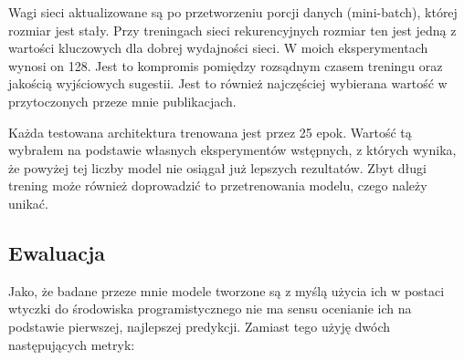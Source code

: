 \begin{description}
Wagi sieci aktualizowane są po przetworzeniu porcji danych (mini-batch), której rozmiar jest stały. Przy treningach sieci rekurencyjnych rozmiar
ten jest jedną z wartości kluczowych dla dobrej wydajności sieci. W moich eksperymentach wynosi on 128. Jest to kompromis pomiędzy rozsądnym 
czasem treningu oraz jakością wyjściowych sugestii. Jest to również najczęściej wybierana wartość w przytoczonych przeze mnie publikacjach.

Każda testowana architektura trenowana jest przez 25 epok. Wartość tą wybrałem na podstawie własnych eksperymentów wstępnych, z których wynika, że 
powyżej tej liczby model nie osiągał już lepszych rezultatów. Zbyt długi trening może również doprowadzić to przetrenowania modelu, czego 
należy unikać. 
\end{description}
\subsection{Ewaluacja}
\label{evaluation}
Jako, że badane przeze mnie modele tworzone są z myślą użycia ich w postaci wtyczki do środowiska programistycznego nie ma sensu ocenianie ich na podstawie pierwszej, najlepszej predykcji. 
Zamiast tego użyję dwóch następujących metryk: 

